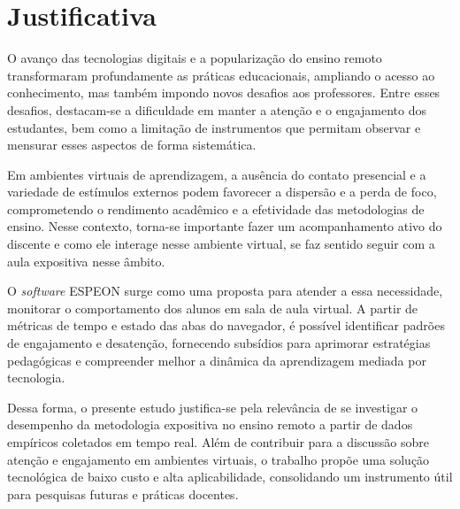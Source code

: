 \section{Justificativa}\label{sec:justificativa}
O avanço das tecnologias digitais e a popularização do ensino remoto transformaram profundamente as práticas educacionais, ampliando o acesso ao conhecimento, mas também impondo novos desafios aos professores. Entre esses desafios, destacam-se a dificuldade em manter a atenção e o engajamento dos estudantes, bem como a limitação de instrumentos que permitam observar e mensurar esses aspectos de forma sistemática.

Em ambientes virtuais de aprendizagem, a ausência do contato presencial e a variedade de estímulos externos podem favorecer a dispersão e a perda de foco, comprometendo o rendimento acadêmico e a efetividade das metodologias de ensino. Nesse contexto, torna-se importante fazer um acompanhamento ativo do discente e como ele interage nesse ambiente virtual, se faz sentido seguir com a aula expositiva nesse âmbito.

O \textit{software} ESPEON surge como uma proposta para atender a essa necessidade, monitorar o comportamento dos alunos em sala de aula virtual. A partir de métricas de tempo e estado das abas do navegador, é possível identificar padrões de engajamento e desatenção, fornecendo subsídios para aprimorar estratégias pedagógicas e compreender melhor a dinâmica da aprendizagem mediada por tecnologia.

Dessa forma, o presente estudo justifica-se pela relevância de se investigar o desempenho da metodologia expositiva no ensino remoto a partir de dados empíricos coletados em tempo real. Além de contribuir para a discussão sobre atenção e engajamento em ambientes virtuais, o trabalho propõe uma solução tecnológica de baixo custo e alta aplicabilidade, consolidando um instrumento útil para pesquisas futuras e práticas docentes.